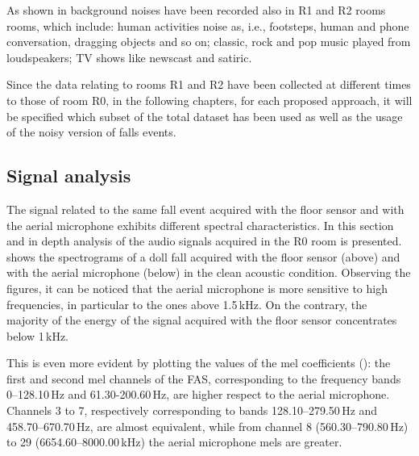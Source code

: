 As shown in  background noises have been recorded also in R1 and R2 rooms rooms, which include: human activities noise as, i.e., footsteps, human and phone conversation, dragging objects and so on; classic, rock and pop music played from loudspeakers; TV shows like newscast and satiric.

Since the data relating to rooms R1 and R2 have been collected at different times to those of room R0, in the following chapters, for each proposed approach, it will be specified which subset of the total dataset has been used as well as the usage of the noisy version of falls events.


\subsection{Signal analysis}\label{ssec:sig_analysis}
The signal related to the same fall event acquired with the floor sensor and with the aerial microphone exhibits different spectral characteristics. In this section and in depth analysis of the audio signals acquired in the R0 room is presented.  shows the spectrograms of a doll fall acquired with the floor sensor (above) and with the aerial microphone (below) in the clean acoustic condition. Observing the figures, it can be noticed that the aerial microphone is more sensitive to high frequencies, in particular to the ones above 1.5\,kHz. On the contrary, the majority of the energy of the signal acquired with the floor sensor concentrates below 1\,kHz. 

This is even more evident by plotting the values of the mel coefficients (): the first and second mel channels of the FAS, corresponding to the frequency bands 0--128.10\,Hz and 61.30-200.60\,Hz, are higher respect to the aerial microphone. Channels 3 to 7, respectively corresponding to bands 128.10--279.50\,Hz and 458.70--670.70\,Hz, are almost equivalent, while from channel 8 (560.30--790.80\,Hz) to 29 (6654.60--8000.00\,kHz) the aerial microphone mels are greater.

